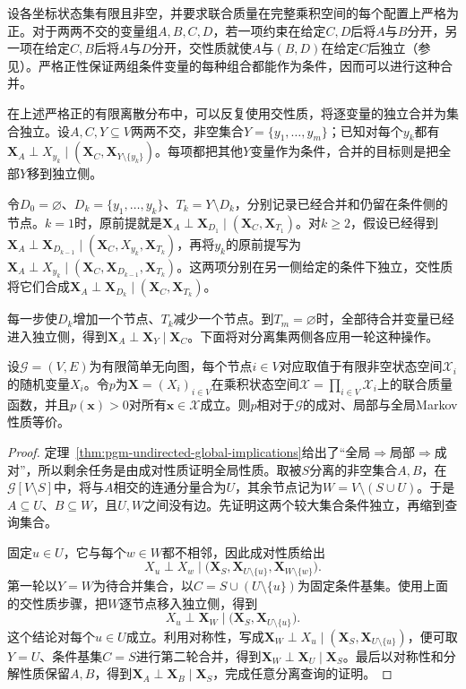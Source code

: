 设各坐标状态集有限且非空，并要求联合质量在完整乘积空间的每个配置上严格为正。对于两两不交的变量组$A,B,C,D$，若一项约束在给定$C,D$后将$A$与$B$分开，另一项在给定$C,B$后将$A$与$D$分开，交性质就使$A$与$(B,D)$在给定$C$后独立（参见）。严格正性保证两组条件变量的每种组合都能作为条件，因而可以进行这种合并。

在上述严格正的有限离散分布中，可以反复使用交性质，将逐变量的独立合并为集合独立。设$A,C,Y\subseteq V$两两不交，非空集合$Y=\{y_1,\ldots,y_m\}$；已知对每个$y_k$都有$\bm{X}_A\perp X_{y_k}\mid(\bm{X}_C,\bm{X}_{Y\setminus\{y_k\}})$。每项都把其他$Y$变量作为条件，合并的目标则是把全部$Y$移到独立侧。

令$D_0=\varnothing$、$D_k=\{y_1,\ldots,y_k\}$、$T_k=Y\setminus D_k$，分别记录已经合并和仍留在条件侧的节点。$k=1$时，原前提就是$\bm{X}_A\perp\bm{X}_{D_1}\mid(\bm{X}_C,\bm{X}_{T_1})$。对$k\geq2$，假设已经得到$\bm{X}_A\perp\bm{X}_{D_{k-1}}\mid(\bm{X}_C,X_{y_k},\bm{X}_{T_k})$，再将$y_k$的原前提写为$\bm{X}_A\perp X_{y_k}\mid(\bm{X}_C,\bm{X}_{D_{k-1}},\bm{X}_{T_k})$。这两项分别在另一侧给定的条件下独立，交性质将它们合成$\bm{X}_A\perp\bm{X}_{D_k}\mid(\bm{X}_C,\bm{X}_{T_k})$。

每一步使$D_k$增加一个节点、$T_k$减少一个节点。到$T_m=\varnothing$时，全部待合并变量已经进入独立侧，得到$\bm{X}_A\perp\bm{X}_Y\mid\bm{X}_C$。下面将对分离集两侧各应用一轮这种操作。

\begin{theorem}[严格正条件下三种Markov性质等价]
  \label{thm:pgm-undirected-markov-equivalence}
  设$\mathcal{G}=(V,E)$为有限简单无向图，每个节点$i\in V$对应取值于有限非空状态空间$\mathcal{X}_i$的随机变量$X_i$。令$p$为$\bm{X}=(X_i)_{i\in V}$在乘积状态空间$\mathcal{X}=\prod_{i\in V}\mathcal{X}_i$上的联合质量函数，并且$p(\bm{x})>0$对所有$\bm{x}\in\mathcal{X}$成立。则$p$相对于$\mathcal{G}$的成对、局部与全局Markov性质等价。
\end{theorem}

\begin{proof}
定理~\ref{thm:pgm-undirected-global-implications}给出了“全局$\Rightarrow$局部$\Rightarrow$成对”，所以剩余任务是由成对性质证明全局性质。取被$S$分离的非空集合$A,B$，在$\mathcal{G}[V\setminus S]$中，将与$A$相交的连通分量合为$U$，其余节点记为$W=V\setminus(S\cup U)$。于是$A\subseteq U$、$B\subseteq W$，且$U,W$之间没有边。先证明这两个较大集合条件独立，再缩到查询集合。

固定$u\in U$，它与每个$w\in W$都不相邻，因此成对性质给出
\[
  X_u\perp X_w
  \mid
  \bigl(\bm{X}_S,\bm{X}_{U\setminus\{u\}},
        \bm{X}_{W\setminus\{w\}}\bigr).
\]
第一轮以$Y=W$为待合并集合，以$C=S\cup(U\setminus\{u\})$为固定条件基集。使用上面的交性质步骤，把$W$逐节点移入独立侧，得到
\[
  X_u\perp\bm{X}_W
  \mid\bigl(\bm{X}_S,\bm{X}_{U\setminus\{u\}}\bigr).
\]
这个结论对每个$u\in U$成立。利用对称性，写成$\bm{X}_W\perp X_u\mid(\bm{X}_S,\bm{X}_{U\setminus\{u\}})$，便可取$Y=U$、条件基集$C=S$进行第二轮合并，得到$\bm{X}_W\perp\bm{X}_U\mid\bm{X}_S$。最后以对称性和分解性质保留$A,B$，得到$\bm{X}_A\perp\bm{X}_B\mid\bm{X}_S$，完成任意分离查询的证明。
\end{proof}

